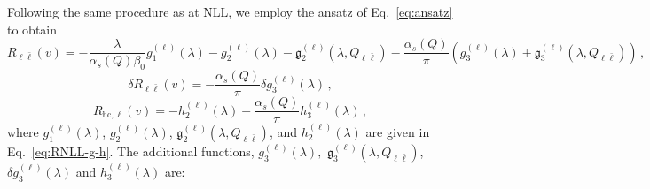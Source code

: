 Following the same procedure as at NLL, we employ the ansatz of
Eq.~\eqref{eq:ansatz} to obtain
\begin{equation}
	R_{\ell\bar\ell}(v)=-\frac{\lambda}{\alpha_s(Q)\beta_0}g_1^{(\ell)}(\lambda)-g_2^{(\ell)}(\lambda)-\mathfrak{g}_2^{(\ell)}(\lambda,Q_{\ell\bar\ell})-\frac{\alpha_s(Q)}{\pi}\left(g_3^{(\ell)}(\lambda)+\mathfrak{g}_3^{(\ell)}(\lambda,Q_{\ell\bar\ell})\right)\,,
\end{equation}
\begin{equation}
	\delta R_{\ell\bar\ell}(v)=-\frac{\alpha_s(Q)}{\pi}\delta g_3^{(\ell)}(\lambda)\,,
\end{equation}
\begin{equation}
	R_{\mathrm{hc},\ell}(v)=-h_2^{(\ell)}(\lambda)-\frac{\alpha_s(Q)}{\pi}h_3^{(\ell)}(\lambda)\,,
\end{equation}
where $g_1^{(\ell)}(\lambda)$, $g_2^{(\ell)}(\lambda)$,
$\mathfrak{g}_2^{(\ell)}(\lambda,Q_{\ell\bar\ell})$, and
$h_2^{(\ell)}(\lambda)$ are given in Eq.~\eqref{eq:RNLL-g-h}.
The additional functions, $g_3^{(\ell)}(\lambda),$ $\mathfrak{g}_3^{(\ell)}(\lambda,Q_{\ell\bar\ell})$, $\delta g_3^{(\ell)}(\lambda)$ and
$h_3^{(\ell)}(\lambda)$ are:

